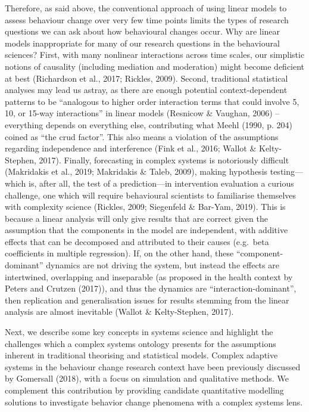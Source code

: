 \documentclass[
  british,
  man,floatsintext]{apa6}
\begin{document}
Therefore, as said above, the conventional approach of using linear models to assess behaviour change over very few time points limits the types of research questions we can ask about how behavioural changes occur. Why are linear models inappropriate for many of our research questions in the behavioural sciences? First, with many nonlinear interactions across time scales, our simplistic notions of causality (including mediation and moderation) might become deficient at best (Richardson et al., 2017; Rickles, 2009). Second, traditional statistical analyses may lead us astray, as there are enough potential context-dependent patterns to be \enquote{analogous to higher order interaction terms that could involve 5, 10, or 15-way interactions} in linear models (Resnicow \& Vaughan, 2006) -- everything depends on everything else, contributing what Meehl (1990, p. 204) coined as \enquote{the crud factor}. This also means a violation of the assumptions regarding independence and interference (Fink et al., 2016; Wallot \& Kelty-Stephen, 2017). Finally, forecasting in complex systems is notoriously difficult (Makridakis et al., 2019; Makridakis \& Taleb, 2009), making hypothesis testing---which is, after all, the test of a prediction---in intervention evaluation a curious challenge, one which will require behavioural scientists to familiarise themselves with complexity science (Rickles, 2009; Siegenfeld \& Bar-Yam, 2019). This is because a linear analysis will only give results that are correct given the assumption that the components in the model are independent, with additive effects that can be decomposed and attributed to their causes (e.g.~beta coefficients in multiple regression). If, on the other hand, these \enquote{component-dominant} dynamics are not driving the system, but instead the effects are intertwined, overlapping and inseparable (as proposed in the health context by Peters and Crutzen (2017)), and thus the dynamics are \enquote{interaction-dominant}, then replication and generalisation issues for results stemming from the linear analysis are almost inevitable (Wallot \& Kelty-Stephen, 2017).

Next, we describe some key concepts in systems science and highlight the challenges which a complex systems ontology presents for the assumptions inherent in traditional theorising and statistical models. Complex adaptive systems in the behaviour change research context have been previously discussed by Gomersall (2018), with a focus on simulation and qualitative methods. We complement this contribution by providing candidate quantitative modelling solutions to investigate behavior change phenomena with a complex systems lens.
\end{document}
